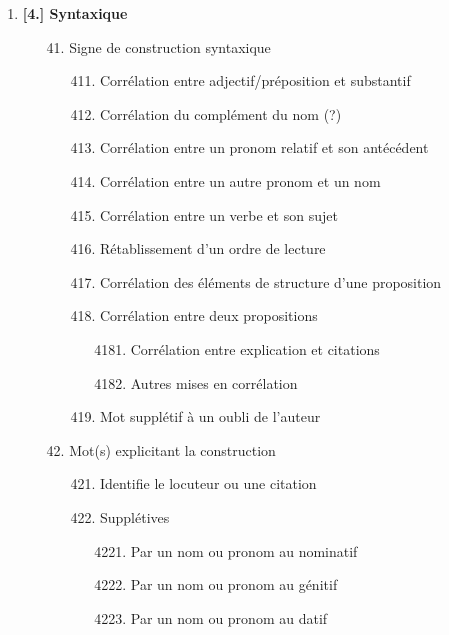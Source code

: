 \documentclass[a4paper, twoside, 12pt]{book}
\begin{document}
{\begin{enumerate}
\begin{enumerate}
    \item[34.] Indication d'adverbe
    \item[35.] Explicite une conjonction
    \item[36.] Explicite une préposition
    \item[37.] Explicite une interjection
  \end{enumerate}
  \item\textbf{[4.] Syntaxique}
  \begin{enumerate}
    \item[41.] Signe de construction syntaxique
    \begin{enumerate}
      \item[411.] Corrélation entre adjectif/préposition et substantif
      \item[412.] Corrélation du complément du nom (?)
      \item[413.] Corrélation entre un pronom relatif et son antécédent
      \item[414.] Corrélation entre un autre pronom et un nom
      \item[415.] Corrélation entre un verbe et son sujet
      \item[416.] Rétablissement d'un ordre de lecture
      \item[417.] Corrélation des éléments de structure d'une proposition
      \item[418.] Corrélation entre deux propositions
      \begin{enumerate}
        \item[4181.] Corrélation entre explication et citations
        \item[4182.] Autres mises en corrélation
      \end{enumerate}
      \item[419.] Mot supplétif à un oubli de l'auteur
    \end{enumerate}
    \item[42.] Mot(s) explicitant la construction
    \begin{enumerate}
      \item[421.] Identifie le locuteur ou une citation
      \item[422.] Supplétives
      \begin{enumerate}
        \item[4221.] Par un nom ou pronom au nominatif
        \item[4222.] Par un nom ou pronom au génitif
        \item[4223.] Par un nom ou pronom au datif

\end{enumerate}
\end{enumerate}
\end{enumerate}
\end{enumerate}}
\end{document}
